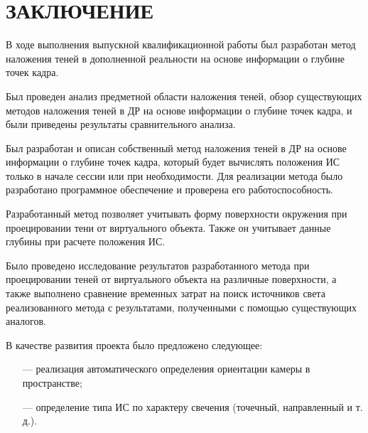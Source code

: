 \chapter*{ЗАКЛЮЧЕНИЕ}

В ходе выполнения выпускной квалификационной работы был разработан метод наложения теней в дополненной реальности на основе информации о глубине точек кадра.

Был проведен анализ предметной области наложения теней, обзор существующих методов наложения теней в ДР на основе информации о глубине точек кадра, и были приведены результаты сравнительного анализа.

Был разработан и описан собственный метод наложения теней в ДР на основе информации о глубине точек кадра, который будет вычислять положения ИС только в начале сессии или при необходимости. Для реализации метода было разработано программное обеспечение и проверена его работоспособность.

Разработанный метод позволяет учитывать форму поверхности окружения при проецировании тени от виртуального объекта. Также он учитывает данные глубины при расчете положения ИС.

Было проведено исследование результатов разработанного метода при проецировании теней от виртуального объекта на различные поверхности, а также выполнено сравнение временных затрат на поиск источников света реализованного метода с результатами, полученными с помощью существующих аналогов.

В качестве развития проекта было предложено следующее:

\begin{itemize}
	\item[---] реализация автоматического определения ориентации камеры в пространстве;
	\item[---] определение типа ИС по характеру свечения (точечный, направленный и т. д.).
\end{itemize}